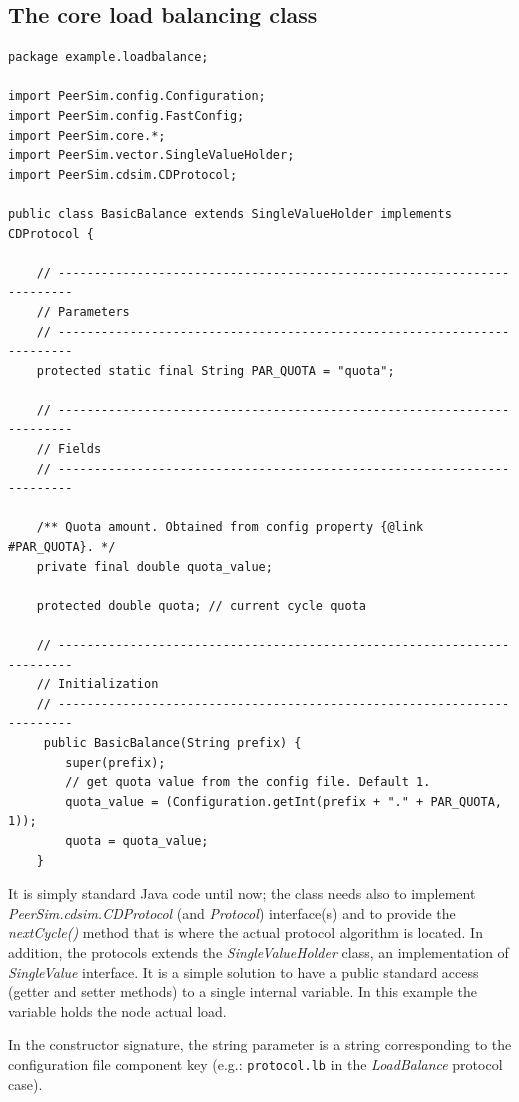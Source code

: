 \documentclass[a4paper,11pt]{article}
\begin{document}
\subsection{The core load balancing class}

\footnotesize
\begin{verbatim}
package example.loadbalance;

import PeerSim.config.Configuration;
import PeerSim.config.FastConfig;
import PeerSim.core.*;
import PeerSim.vector.SingleValueHolder;
import PeerSim.cdsim.CDProtocol;

public class BasicBalance extends SingleValueHolder implements CDProtocol {

    // ------------------------------------------------------------------------
    // Parameters
    // ------------------------------------------------------------------------
    protected static final String PAR_QUOTA = "quota";

    // ------------------------------------------------------------------------
    // Fields
    // ------------------------------------------------------------------------

    /** Quota amount. Obtained from config property {@link #PAR_QUOTA}. */
    private final double quota_value;

    protected double quota; // current cycle quota

    // ------------------------------------------------------------------------
    // Initialization
    // ------------------------------------------------------------------------
     public BasicBalance(String prefix) {
        super(prefix);
        // get quota value from the config file. Default 1.
        quota_value = (Configuration.getInt(prefix + "." + PAR_QUOTA, 1));
        quota = quota_value;
    }
\end{verbatim}
\normalsize

It is simply standard Java code until now; the class needs also to
implement \emph{PeerSim.cdsim.CDProtocol} (and \emph{Protocol})
interface(s) and to provide  the \emph{nextCycle()} method 
that is where the actual protocol algorithm is located.
In addition, the protocols extends the \emph{SingleValueHolder} class,
an implementation of \emph{SingleValue} interface. It is a simple
solution to have a public standard access (getter and setter methods)
to a single internal variable. In this example the variable holds the
node actual load.  

In the constructor signature, the string parameter 
is a string corresponding to the configuration file component key
(e.g.: \texttt{protocol.lb} in the \emph{LoadBalance} protocol case).
\end{document}
